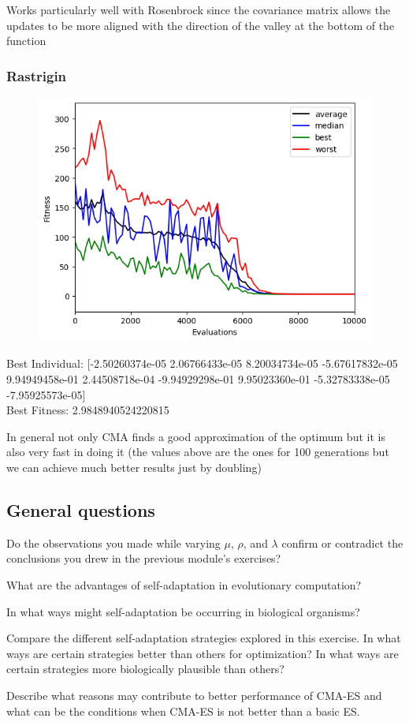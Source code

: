 Works particularly well with Rosenbrock since the covariance matrix allows the updates to be more aligned with the direction of the valley at the bottom of the function

\subsubsection{Rastrigin}
\begin{figure}[H]
    \centering
    \includegraphics[width=\linewidth]{images/lab3/ras_cma.png}
\end{figure}
Best Individual: [-2.50260374e-05  2.06766433e-05  8.20034734e-05 -5.67617832e-05 9.94949458e-01  2.44508718e-04 -9.94929298e-01  9.95023360e-01 -5.32783338e-05 -7.95925573e-05] \\
Best Fitness: 2.9848940524220815

\noindent In general not only CMA finds a good approximation of the optimum but it is also very fast in doing it (the values above are the ones for 100 generations but we can achieve much better results just by doubling)

\subsection{General questions}
Do the observations you made while varying $\mu$, $\rho$, and $\lambda$ confirm or contradict the conclusions you drew in the previous module's exercises?

What are the advantages of self-adaptation in evolutionary computation?

In what ways might self-adaptation be occurring in biological organisms?

Compare the different self-adaptation strategies explored in this exercise. In what ways are certain strategies better than others for optimization? In what ways are certain strategies more biologically plausible than others?

Describe what reasons may contribute to better performance of CMA-ES and what can be the conditions when CMA-ES is not better than a basic ES.
